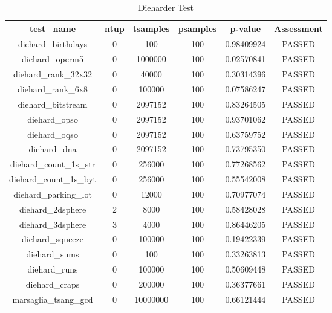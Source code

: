 \begin{itemize}
\begin{table}[h!]
\begin{center}
\caption{Dieharder Test}
\label{tab:table1}
\begin{tabular}{|c|c|c|c|c|c|} %
    \hline
    \textbf{test\_name} & \textbf{ntup} & \textbf{tsamples} & \textbf{psamples} & \textbf{p-value} & \textbf{Assessment}\\
    \hline
    diehard\_birthdays &    0 &        100 &      100 & 0.98409924 &   PASSED \\  
    diehard\_operm5 &    0 &    1000000 &      100 & 0.02570841 &   PASSED \\  
    diehard\_rank\_32x32 &    0 &      40000 &      100 & 0.30314396 &   PASSED \\  
    diehard\_rank\_6x8 &    0 &     100000 &      100 & 0.07586247 &   PASSED \\  
    diehard\_bitstream &    0 &    2097152 &      100 & 0.83264505 &   PASSED \\  
    diehard\_opso &    0 &    2097152 &      100 & 0.93701062 &   PASSED \\  
    diehard\_oqso &    0 &    2097152 &      100 & 0.63759752 &   PASSED \\  
    diehard\_dna &    0 &    2097152 &      100 & 0.73795350 &   PASSED \\  
    diehard\_count\_1s\_str &    0 &     256000 &      100 & 0.77268562 &   PASSED \\  
    diehard\_count\_1s\_byt &    0 &     256000 &      100 & 0.55542008 &   PASSED \\  
    diehard\_parking\_lot &    0 &      12000 &      100 & 0.70977074 &   PASSED \\  
    diehard\_2dsphere &    2 &       8000 &      100 & 0.58428028 &   PASSED \\  
    diehard\_3dsphere &    3 &       4000 &      100 & 0.86446205 &   PASSED \\  
    diehard\_squeeze &    0 &     100000 &      100 & 0.19422339 &   PASSED \\  
    diehard\_sums &    0 &        100 &      100 & 0.33263813 &   PASSED \\  
    diehard\_runs &    0 &     100000 &      100 & 0.50609448 &   PASSED \\    
    diehard\_craps &    0 &     200000 &      100 & 0.36377661 &   PASSED \\   
    marsaglia\_tsang\_gcd &    0 &   10000000 &      100 & 0.66121444 &   PASSED \\ 

\end{tabular}
\end{center}
\end{table}
\end{itemize}
